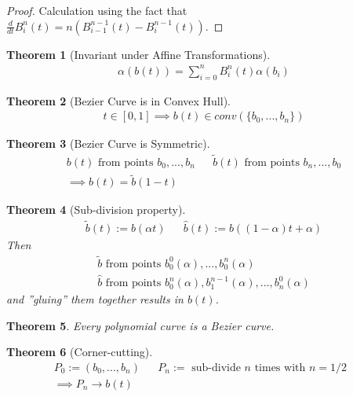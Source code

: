 \documentclass[conference]{IEEEtran}
\newtheorem{theorem}{Theorem}
\begin{document}
\begin{proof}
	Calculation using the fact that\\
	$\frac{d}{dt} B_i^n(t) = n (B_{i-1}^{n-1}(t) - B_i^{n-1}(t))$.
\end{proof}

\begin{theorem}[Invariant under Affine Transformations]
	\begin{align*}
		\alpha(b(t)) = \sum_{i=0}^{n} B_i^n(t) \alpha(b_i)
	\end{align*}
\end{theorem}

\begin{theorem}[Bezier Curve is in Convex Hull]
	\begin{align*}
		t \in [0, 1] \implies b(t) \in conv(\{b_0, ..., b_n\})
	\end{align*}
\end{theorem}

\begin{theorem}[Bezier Curve is Symmetric]
	\begin{align*}
		b(t) \text{ from points } b_0, ..., b_n && \tilde{b}(t) \text{ from points } b_n, ..., b_0\\
		\implies b(t) = \tilde{b}(1-t)
	\end{align*}
\end{theorem}

\newpage
\begin{theorem}[Sub-division property]
	\begin{align*}
		\tilde{b}(t) := b(\alpha t) && \hat{b}(t) := b((1-\alpha)t + \alpha)
	\end{align*}
	Then
	\begin{align*}
		\tilde{b} \text{ from points } b_0^0(\alpha), ..., b_0^n(\alpha)\\
		\hat{b} \text{ from points } b_0^n(\alpha), b_1^{n-1}(\alpha), ..., b_n^0(\alpha)
	\end{align*}
	and ''gluing'' them together results in $b(t)$.
\end{theorem}

\begin{theorem}
	Every polynomial curve is a Bezier curve.
\end{theorem}

\begin{theorem}[Corner-cutting]
	\begin{align*}
		P_0 := (b_0, ..., b_n) && P_n := \text{ sub-divide $n$ times with $n=1/2$ }\\
		\implies P_n \rightarrow b(t)
	\end{align*}
\end{theorem}
\end{document}
